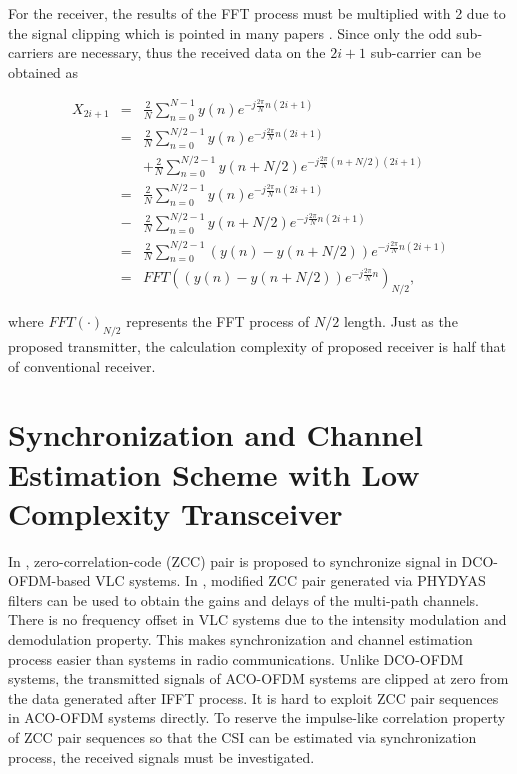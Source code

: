 \documentclass[journal]{IEEEtran}
\begin{document}
		For the receiver, the results of the FFT process must be multiplied with 2 due to the signal clipping which is pointed in many papers \cite{Wang2017Optical}. Since only the odd sub-carriers are necessary, thus the received data on the $ 2i+1 $ sub-carrier can be obtained as
        \begin{small}
		\begin{eqnarray}\label{equ:sim_receiver}
			X_{2i+1} &=& \frac{2}{N}\sum_{n=0}^{N-1} y(n) e^{-j\frac{2\pi}{N}n(2i+1)}\nonumber\\
					 &=& \frac{2}{N}\sum_{n=0}^{N/2-1} y(n) e^{-j\frac{2\pi}{N}n(2i+1)}  \nonumber\\
					 &&+ \frac{2}{N}\sum_{n=0}^{N/2-1} y(n+N/2) e^{-j\frac{2\pi}{N}(n+N/2)(2i+1)} \nonumber\\
					 &=& \frac{2}{N}\sum_{n=0}^{N/2-1} y(n) e^{-j\frac{2\pi}{N}n(2i+1)}  \nonumber\\
					 &-& \frac{2}{N}\sum_{n=0}^{N/2-1} y(n+N/2) e^{-j\frac{2\pi}{N}n(2i+1)} \nonumber\\
					 &=& \frac{2}{N}\sum_{n=0}^{N/2-1} ( y(n)-y(n+N/2) ) e^{-j\frac{2\pi}{N}n(2i+1)}  \nonumber\\
					 &=& FFT( ( y(n)-y(n+N/2) ) e^{-j\frac{2\pi}{N}n} )_{N/2},
		\end{eqnarray}
        \end{small}
		where $ FFT(\cdot)_{N/2} $	represents the FFT process of $ N/2 $ length. Just as the proposed transmitter, the calculation complexity of proposed receiver is half that of conventional receiver.
				
		
\section{Synchronization and Channel Estimation Scheme with Low Complexity Transceiver}		
	In \cite{Qian2016Synchronisation}, zero-correlation-code (ZCC) pair is proposed to synchronize signal in DCO-OFDM-based VLC systems. In \cite{Qian2017}, modified ZCC pair generated via PHYDYAS filters can be used to obtain the gains and delays of the multi-path channels. There is no frequency offset in VLC systems due to the intensity modulation and demodulation property. This makes synchronization and channel estimation process easier than systems in radio communications. Unlike DCO-OFDM systems, the transmitted signals of ACO-OFDM systems are clipped at zero from the data generated after IFFT process. It is hard to exploit ZCC pair sequences in ACO-OFDM systems directly. To reserve the impulse-like correlation property of ZCC pair sequences so that the CSI can be estimated via synchronization process, the received signals must be investigated.
	
\end{document}
